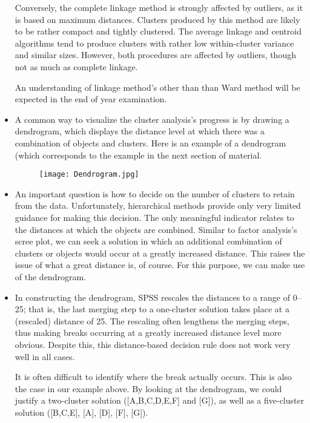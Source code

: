 \documentclass[a4paper,12pt]{article}
\begin{document}
\begin{itemize}
Conversely, the complete linkage method is strongly affected by outliers, as it is based on maximum distances. Clusters produced by this method are likely to be rather compact and tightly clustered. The average linkage and centroid algorithms tend to produce clusters with rather low within-cluster variance and similar sizes.
However, both procedures are affected by outliers, though not as much as complete linkage.

An understanding of linkage method's other than than Ward method will be expected in the end of year examination.

\item A common way to visualize the cluster analysis’s progress is by drawing a
dendrogram, which displays the distance level at which there was a combination
of objects and clusters.
Here is an example of a dendrogram (which corresponds to the example in the next section of material.


\begin{figure}[h!]
\begin{center}
  \texttt{[image: Dendrogram.jpg]}\\
\end{center}
\end{figure}

\item An important question is how to decide on the number of
clusters to retain from the data. Unfortunately, hierarchical methods provide only
very limited guidance for making this decision. The only meaningful indicator
relates to the distances at which the objects are combined. Similar to factor
analysis’s scree plot, we can seek a solution in which an additional combination
of clusters or objects would occur at a greatly increased distance. This raises the
issue of what a great distance is, of course. For this purpose, we can make use of the dendrogram.

\item In constructing the dendrogram, SPSS rescales the distances to a range
of 0–25; that is, the last merging step to a one-cluster solution takes place at a
(rescaled) distance of 25. The rescaling often lengthens the merging steps, thus
making breaks occurring at a greatly increased distance level more obvious.
Despite this, this distance-based decision rule does not work very well in all
cases.

It is often difficult to identify where the break actually occurs. This is also
the case in our example above. By looking at the dendrogram, we could justify
a two-cluster solution ([A,B,C,D,E,F] and [G]), as well as a five-cluster solution
([B,C,E], [A], [D], [F], [G]).


\end{itemize}
\newpage
\end{document}
